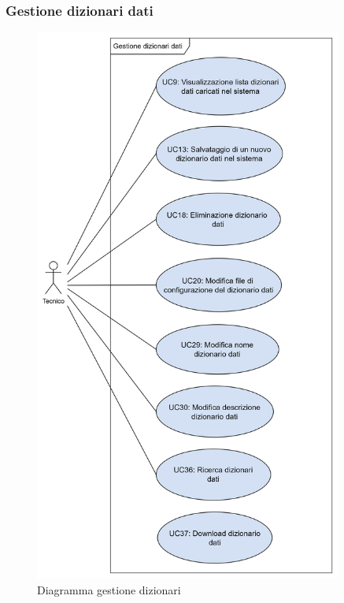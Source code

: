 \subsubsection*{Gestione dizionari dati}
\begin{figure}[H]
  \centering
  \includegraphics[width=0.90\textwidth, height=0.95\textheight]{assets/gestione_dizionari.png}
  \caption{Diagramma gestione dizionari}
\end{figure}










